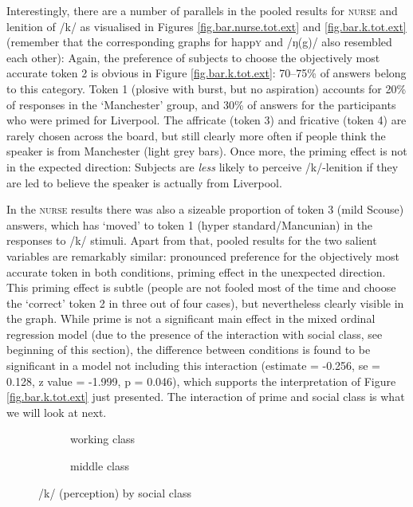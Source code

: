 Interestingly, there are a number of parallels in the pooled results for \textsc{nurse} and lenition of /k/ as visualised in Figures \ref{fig.bar.nurse.tot.ext} and \ref{fig.bar.k.tot.ext} (remember that the corresponding graphs for happ\textsc{y} and /ŋ(g)/ also resembled each other):
Again, the preference of subjects to choose the objectively most accurate token 2 is obvious in Figure \ref{fig.bar.k.tot.ext}: 70--75\% of answers belong to this category.
Token 1 (plosive with burst, but no aspiration) accounts for 20\% of responses in the `Manchester' group, and 30\% of answers for the participants who were primed for Liverpool.
The affricate (token 3) and fricative (token 4) are rarely chosen across the board, but still clearly more often if people think the speaker is from Manchester (light grey bars).
Once more, the priming effect is not in the expected direction: Subjects are \emph{less} likely to perceive /k/-lenition if they are led to believe the speaker is actually from Liverpool.

In the \textsc{nurse} results there was also a sizeable proportion of token 3 (mild Scouse) answers, which has `moved' to token 1 (hyper standard/Mancunian) in the responses to /k/ stimuli.
Apart from that, pooled results for the two salient variables are remarkably similar: pronounced preference for the objectively most accurate token in both conditions, priming effect in the unexpected direction.
This priming effect is subtle (people are not fooled most of the time and choose the `correct' token 2 in three out of four cases), but nevertheless clearly visible in the graph.
While prime is not a significant main effect in the mixed ordinal regression model (due to the presence of the interaction with social class, see beginning of this section), the difference between conditions is found to be significant in a model not including this interaction (estimate = -0.256, se = 0.128, z value = -1.999, p = 0.046), which supports the interpretation of Figure \ref{fig.bar.k.tot.ext} just presented.
The interaction of prime and social class is what we will look at next.

\begin{figure}[h]
	\centering
	\begin{subfigure}{0.49\textwidth}
		\centering
			\resizebox{\linewidth}{!}{} 
		\caption{working class}
		\label{fig.bar.k.ext.wc}
	\end{subfigure}
	\begin{subfigure}{0.49\textwidth}
		\centering
			\resizebox{\linewidth}{!}{} 
		\caption{middle class}
		\label{fig.bar.k.ext.mc}
	\end{subfigure}
	\caption{/k/ (perception) by social class}
	\label{fig.bar.k.ext.class}
\end{figure}

